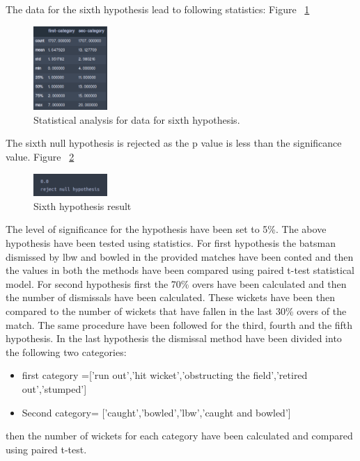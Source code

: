 \documentclass[fleqn,10pt]{wlscirep}
\begin{document}
\begin{enumerate}
The data for the sixth hypothesis lead to following statistics: Figure ~\ref{fig:eighteen}
  
\begin{figure}[H]
    \centering
    \includegraphics[width=0.25\textwidth]{third.png}
    \caption{Statistical analysis for data for sixth hypothesis.}
    \label{fig:eighteen}
  \end{figure}

  The sixth null hypothesis is rejected as the p value is less than the significance value. Figure ~\ref{fig:ninteen}
  \begin{figure}[H]
    \centering
    \includegraphics[width=0.25\textwidth]{thirdone.png}
    \caption{Sixth hypothesis result}
    \label{fig:ninteen}
  \end{figure}

\end{enumerate}
The level of significance for the hypothesis have been set to 5\%.
The above hypothesis have been tested using statistics.\newline
For first hypothesis the batsman dismissed by lbw and bowled in the provided matches have been conted and 
then the values in both the methods have been compared using paired t-test statistical model.\newline
For second hypothesis first the 70\% overs have been calculated and then the number of dismissals have been calculated.
These wickets have been then compared to the number of wickets that have fallen in the last 30\% overs of the match.\newline
The same procedure have been followed for the third, fourth and the fifth hypothesis.\newline
In the last hypothesis the dismissal method have been divided into the following two categories:
    \begin{itemize}
        \item first category =['run out','hit wicket','obstructing the field','retired out','stumped']
        \item Second category= ['caught','bowled','lbw','caught and bowled']
    \end{itemize}
then the number of wickets for each category have been calculated and compared using paired t-test. 
\end{document}
